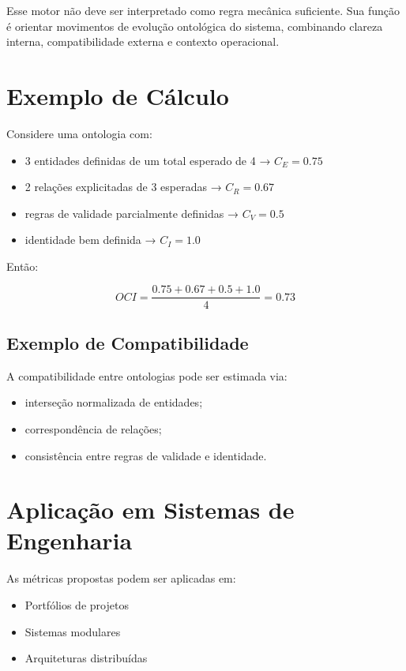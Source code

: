 \documentclass[12pt,a4paper]{article}
\begin{document}
Esse motor não deve ser interpretado como regra mecânica suficiente. Sua função é orientar movimentos de evolução ontológica do sistema, combinando clareza interna, compatibilidade externa e contexto operacional.


\section{Exemplo de Cálculo}

Considere uma ontologia com:

\begin{itemize}
	\item 3 entidades definidas de um total esperado de 4 → \(C_E = 0.75\)
	\item 2 relações explicitadas de 3 esperadas → \(C_R = 0.67\)
	\item regras de validade parcialmente definidas → \(C_V = 0.5\)
	\item identidade bem definida → \(C_I = 1.0\)
\end{itemize}

Então:

\[
OCI = \frac{0.75 + 0.67 + 0.5 + 1.0}{4} = 0.73
\]

\subsection{Exemplo de Compatibilidade}

A compatibilidade entre ontologias pode ser estimada via:

\begin{itemize}
	\item interseção normalizada de entidades;
	\item correspondência de relações;
	\item consistência entre regras de validade e identidade.
\end{itemize}


	\section{Aplicação em Sistemas de Engenharia}

	As métricas propostas podem ser aplicadas em:

	\begin{itemize}
		\item Portfólios de projetos
		\item Sistemas modulares
		\item Arquiteturas distribuídas
	\end{itemize}
\end{document}
